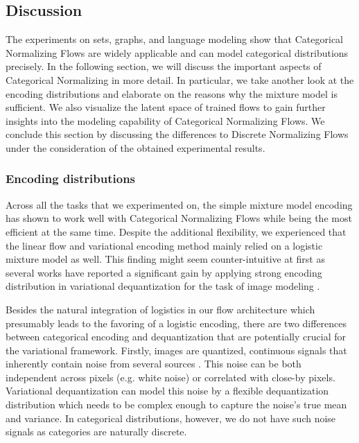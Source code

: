 \subsection{Discussion}
\label{sec:experiments_discussion}

The experiments on sets, graphs, and language modeling show that Categorical Normalizing Flows are widely applicable and can model categorical distributions precisely.
In the following section, we will discuss the important aspects of Categorical Normalizing in more detail.
In particular, we take another look at the encoding distributions and elaborate on the reasons why the mixture model is sufficient.
We also visualize the latent space of trained flows to gain further insights into the modeling capability of Categorical Normalizing Flows.
We conclude this section by discussing the differences to Discrete Normalizing Flows under the consideration of the obtained experimental results.

\subsubsection{Encoding distributions} 

Across all the tasks that we experimented on, the simple mixture model encoding has shown to work well with Categorical Normalizing Flows while being the most efficient at the same time.
Despite the additional flexibility, we experienced that the linear flow and variational encoding method mainly relied on a logistic mixture model as well.
This finding might seem counter-intuitive at first as several works have reported a significant gain by applying strong encoding distribution in variational dequantization for the task of image modeling \cite{Flow++, EmielDequantization, VFlow}. 

Besides the natural integration of logistics in our flow architecture which presumably leads to the favoring of a logistic encoding, there are two differences between categorical encoding and dequantization that are potentially crucial for the variational framework. 
Firstly, images are quantized, continuous signals that inherently contain noise from several sources \cite{NoiseModelsImages}. 
This noise can be both independent across pixels (e.g. white noise) or correlated with close-by pixels.
Variational dequantization can model this noise by a flexible dequantization distribution which needs to be complex enough to capture the noise's true mean and variance. 
In categorical distributions, however, we do not have such noise signals as categories are naturally discrete.  

